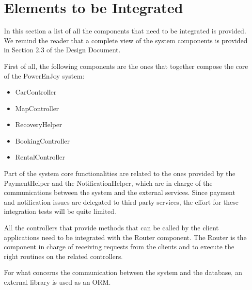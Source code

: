 
\section{Elements to be Integrated}
In this section a list of all the components that need to be integrated is provided. We remind the reader that a complete view of the system components is provided in Section 2.3 of the Design Document.

First of all, the following components are the ones that together compose the core of the PowerEnJoy system:

\begin{itemize}
	\item CarController
	\item MapController
	\item RecoveryHelper
	\item BookingController
	\item RentalController
\end{itemize}

Part of the system core functionalities are related to the ones provided by the PaymentHelper and the NotificationHelper, which are in charge of the communications between the system and the external services. Since payment and notification issues are delegated to third party services, the effort for these integration tests will be quite limited.

All the controllers that provide methods that can be called by the client applications need to be integrated with the Router component. The Router is the component in charge of receiving requests from the clients and to execute the right routines on the related controllers.

For what concerns the communication between the system and the database, an external library is used as an ORM.
